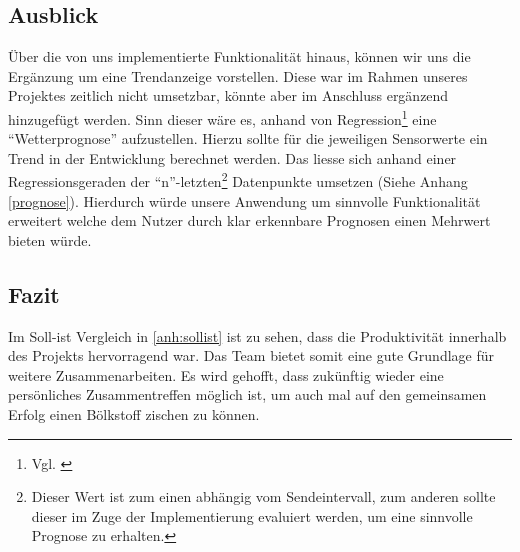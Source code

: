 \subsection{Ausblick}
Über die von uns implementierte Funktionalität hinaus, können wir uns die Ergänzung um eine Trendanzeige vorstellen.
Diese war im Rahmen unseres Projektes zeitlich nicht umsetzbar, könnte aber im Anschluss ergänzend hinzugefügt werden.
Sinn dieser wäre es, anhand von Regression\footnote{Vgl. \cite{regression}} eine \enquote{Wetterprognose} aufzustellen.
Hierzu sollte für die jeweiligen Sensorwerte ein Trend in der Entwicklung berechnet werden.
Das liesse sich anhand einer Regressionsgeraden der \enquote{n}-letzten\footnote{Dieser Wert ist zum einen abhängig vom Sendeintervall, zum anderen sollte dieser im Zuge der Implementierung evaluiert werden, um eine sinnvolle Prognose zu erhalten.} Datenpunkte umsetzen (Siehe Anhang \ref{prognose}).
Hierdurch würde unsere Anwendung um sinnvolle Funktionalität erweitert welche dem Nutzer durch klar erkennbare Prognosen einen Mehrwert bieten würde.

\subsection{Fazit}\label{subsec:fazit}
Im Soll-ist Vergleich in \autoref{anh:sollist} ist zu sehen, dass die Produktivität innerhalb des Projekts hervorragend war. Das Team bietet somit eine
gute Grundlage für weitere Zusammenarbeiten. Es wird gehofft, dass zukünftig wieder eine persönliches Zusammentreffen möglich ist,
um auch mal auf den gemeinsamen Erfolg einen Bölkstoff zischen zu können.


